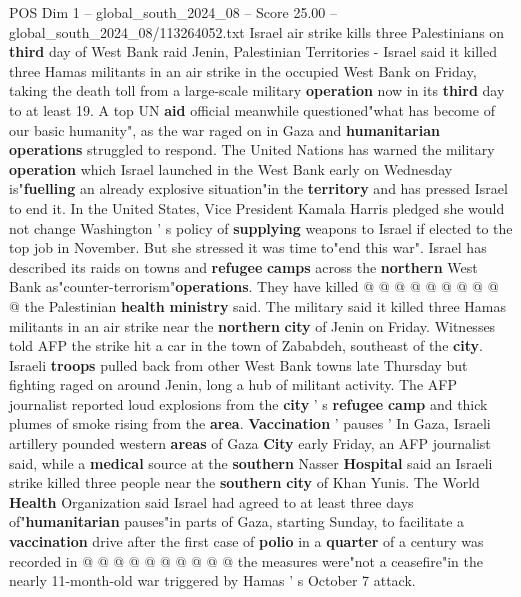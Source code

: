 \begin{textsample}{POS Dim 1 – global\_south\_2024\_08 – Score 25.00 – global\_south\_2024\_08/113264052.txt}  \label{ex:f1_pos_330}
Israel air strike kills three Palestinians on \textbf{third} day of West Bank raid Jenin, Palestinian Territories - Israel said it killed three Hamas militants in an air strike in the occupied West Bank on Friday, taking the death toll from a large-scale military \textbf{operation} now in its \textbf{third} day to at least 19.
A top UN \textbf{aid} official meanwhile questioned"what has become of our basic humanity", as the war raged on in Gaza and \textbf{humanitarian} \textbf{operations} struggled to respond.
The United Nations has warned the military \textbf{operation} which Israel launched in the West Bank early on Wednesday is"\textbf{fuelling} an already explosive situation"in the \textbf{territory} and has pressed Israel to end it.
In the United States, Vice President Kamala Harris pledged she would not change Washington ' s policy of \textbf{supplying} weapons to Israel if elected to the top job in November.
But she stressed it was time to"end this war".
Israel has described its raids on towns and \textbf{refugee} \textbf{camps} across the \textbf{northern} West Bank as"counter-terrorism"\textbf{operations}.
They have killed @ @ @ @ @ @ @ @ @ @ the Palestinian \textbf{health} \textbf{ministry} said.
The military said it killed three Hamas militants in an air strike near the \textbf{northern} \textbf{city} of Jenin on Friday.
Witnesses told AFP the strike hit a car in the town of Zababdeh, southeast of the \textbf{city}.
Israeli \textbf{troops} pulled back from other West Bank towns late Thursday but fighting raged on around Jenin, long a hub of militant activity.
The AFP journalist reported loud explosions from the \textbf{city} ' s \textbf{refugee} \textbf{camp} and thick plumes of smoke rising from the \textbf{area}. \textbf{Vaccination} ' pauses ' In Gaza, Israeli artillery pounded western \textbf{areas} of Gaza \textbf{City} early Friday, an AFP journalist said, while a \textbf{medical} source at the \textbf{southern} Nasser \textbf{Hospital} said an Israeli strike killed three people near the \textbf{southern} \textbf{city} of Khan Yunis.
The World \textbf{Health} Organization said Israel had agreed to at least three days of"\textbf{humanitarian} pauses"in parts of Gaza, starting Sunday, to facilitate a \textbf{vaccination} drive after the first case of \textbf{polio} in a \textbf{quarter} of a century was recorded in @ @ @ @ @ @ @ @ @ @ the measures were"not a ceasefire"in the nearly 11-month-old war triggered by Hamas ' s October 7 attack.

\end{textsample}

